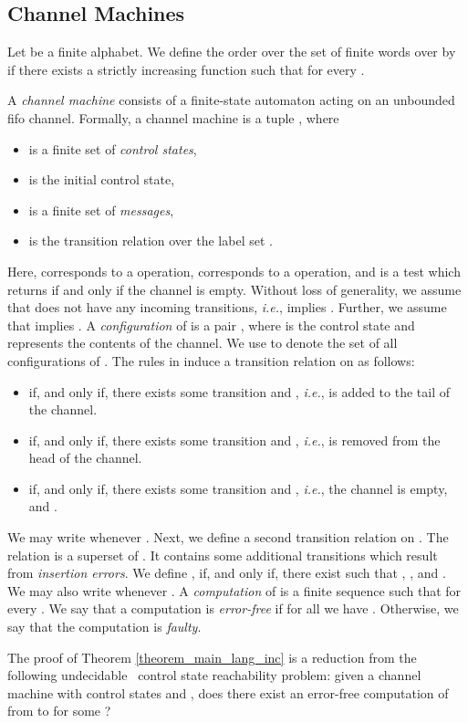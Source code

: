 \documentclass{CSML}
\theoremstyle{plain}\newtheorem{theorem}[thm]{Theorem}
\theoremstyle{plain}\newtheorem{corollary}[thm]{Corollary}
\theoremstyle{plain}\newtheorem{example}[thm]{Example}
\theoremstyle{plain}\newtheorem{lemma}[thm]{Lemma}
\theoremstyle{plain}\newtheorem{remark}[thm]{Remark}
\newcommand*\ie{\textit{i.e.}}
\begin{document}
	\subsection{Channel Machines}
Let  be a finite alphabet. 
We define the order  over the set of finite words over  by 
 if there exists a strictly increasing function  such that  for every . 

A \emph{channel machine} consists of a finite-state automaton acting on an  unbounded fifo channel. Formally, 
a channel machine is a tuple , where
\begin{itemize}
\item  is a finite set of \emph{control states},
	\item  is the initial control state,
	\item  is a finite set of \emph{messages},
	\item  is the transition relation over the label set .
\end{itemize}
Here,  corresponds to a  operation,  corresponds to a  operation, and  is a test which returns  if and only if the channel is empty.
Without loss of generality, we assume that  does not have any incoming transitions, \ie,  implies .
Further, we assume that  implies . 
A \emph{configuration} of  is a pair , where  is the control state and  represents the contents of the channel.
We use  to denote the set of all configurations of . 
The rules in  induce a transition relation  on  as follows:
\begin{itemize}
\item  if, and only if, there exists some transition  and , \ie,  is added to the tail of the channel.
\item  if, and only if, there exists some transition  and , \ie,  is removed from the head of the channel. 
\item  if, and only if, there exists some transition  and , \ie, the channel is empty, and . 
\end{itemize}
We may write  whenever .
Next, we define a second transition relation   on . The relation  is a superset of . It contains some additional transitions which result from \emph{insertion errors}. We define , if, and only if, there exist  such that , , and .
We may also write  whenever . 
A \emph{computation} of  is a finite sequence  such that  for every . 
We say that a computation is \emph{error-free} if for all  we have .
Otherwise, we say that the computation is \emph{faulty}.

The proof of Theorem \ref{theorem_main_lang_inc}  is a reduction from the following undecidable~\cite{Brand:1983:CFM:322374.322380} control state reachability problem: given a channel machine  with control states  and , does there exist an error-free computation of  from  to  for some ?
\end{document}
